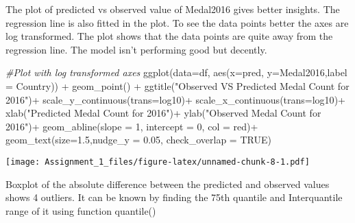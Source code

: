 \documentclass[
]{article}
\newenvironment{Shaded}{\begin{snugshade}}{\end{snugshade}}
\newcommand{\AttributeTok}[1]{\textcolor[rgb]{0.77,0.63,0.00}{#1}}
\newcommand{\CommentTok}[1]{\textcolor[rgb]{0.56,0.35,0.01}{\textit{#1}}}
\newcommand{\ConstantTok}[1]{\textcolor[rgb]{0.00,0.00,0.00}{#1}}
\newcommand{\DecValTok}[1]{\textcolor[rgb]{0.00,0.00,0.81}{#1}}
\newcommand{\FloatTok}[1]{\textcolor[rgb]{0.00,0.00,0.81}{#1}}
\newcommand{\FunctionTok}[1]{\textcolor[rgb]{0.00,0.00,0.00}{#1}}
\newcommand{\NormalTok}[1]{#1}
\newcommand{\SpecialCharTok}[1]{\textcolor[rgb]{0.00,0.00,0.00}{#1}}
\newcommand{\StringTok}[1]{\textcolor[rgb]{0.31,0.60,0.02}{#1}}
\begin{document}
The plot of predicted vs observed value of Medal2016 gives better
insights. The regression line is also fitted in the plot. To see the
data points better the axes are log transformed. The plot shows that the
data points are quite away from the regression line. The model isn't
performing good but decently.

\begin{Shaded}
\begin{Highlighting}[]
\CommentTok{\#Plot with log transformed axes}
\FunctionTok{ggplot}\NormalTok{(}\AttributeTok{data=}\NormalTok{df, }\FunctionTok{aes}\NormalTok{(}\AttributeTok{x=}\NormalTok{pred, }\AttributeTok{y=}\NormalTok{Medal2016,}\AttributeTok{label =}\NormalTok{ Country)) }\SpecialCharTok{+}
  \FunctionTok{geom\_point}\NormalTok{() }\SpecialCharTok{+}
  \FunctionTok{ggtitle}\NormalTok{(}\StringTok{"Observed VS Predicted Medal Count for 2016"}\NormalTok{)}\SpecialCharTok{+}
  \FunctionTok{scale\_y\_continuous}\NormalTok{(}\AttributeTok{trans=}\StringTok{\textquotesingle{}log10\textquotesingle{}}\NormalTok{)}\SpecialCharTok{+}
  \FunctionTok{scale\_x\_continuous}\NormalTok{(}\AttributeTok{trans=}\StringTok{\textquotesingle{}log10\textquotesingle{}}\NormalTok{)}\SpecialCharTok{+}
  \FunctionTok{xlab}\NormalTok{(}\StringTok{"Predicted Medal Count for 2016"}\NormalTok{)}\SpecialCharTok{+}
  \FunctionTok{ylab}\NormalTok{(}\StringTok{"Observed Medal Count for 2016"}\NormalTok{)}\SpecialCharTok{+}
  \FunctionTok{geom\_abline}\NormalTok{(}\AttributeTok{slope =} \DecValTok{1}\NormalTok{, }\AttributeTok{intercept =} \DecValTok{0}\NormalTok{, }\AttributeTok{col =} \StringTok{\textquotesingle{}red\textquotesingle{}}\NormalTok{)}\SpecialCharTok{+}
  \FunctionTok{geom\_text}\NormalTok{(}\AttributeTok{size=}\FloatTok{1.5}\NormalTok{,}\AttributeTok{nudge\_y =} \FloatTok{0.05}\NormalTok{,  }\AttributeTok{check\_overlap =} \ConstantTok{TRUE}\NormalTok{)}
\end{Highlighting}
\end{Shaded}

\texttt{[image: Assignment\_1\_files/figure-latex/unnamed-chunk-8-1.pdf]}

Boxplot of the absolute difference between the predicted and observed
values shows 4 outliers. It can be known by finding the 75th quantile
and Interquantile range of it using function quantile()

\begin{Shaded}
\end{Shaded}
\end{document}
